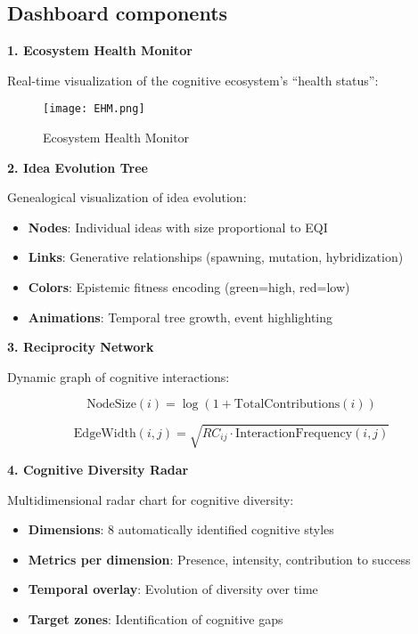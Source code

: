 \subsection{Dashboard components}

\textbf{1. Ecosystem Health Monitor}

Real-time visualization of the cognitive ecosystem's ``health status'':

\begin{figure}[htbp]
	\centering
	\texttt{[image: EHM.png]}
	\caption{Ecosystem Health Monitor}
	\label{tabella:Ecosystem Health Monitor}
\end{figure}

\textbf{2. Idea Evolution Tree}

Genealogical visualization of idea evolution:

\begin{itemize}
	\item \textbf{Nodes}: Individual ideas with size proportional to EQI
	\item \textbf{Links}: Generative relationships (spawning, mutation, hybridization)
	\item \textbf{Colors}: Epistemic fitness encoding (green=high, red=low)
	\item \textbf{Animations}: Temporal tree growth, event highlighting
\end{itemize}

\textbf{3. Reciprocity Network}

Dynamic graph of cognitive interactions:

\begin{equation}
	\text{NodeSize}(i) = \log(1 + \text{TotalContributions}(i))
	\label{eq:node-size}
\end{equation}

\begin{equation}
	\text{EdgeWidth}(i,j) = \sqrt{RC_{ij} \cdot \text{InteractionFrequency}(i,j)}
	\label{eq:edge-width}
\end{equation}

\textbf{4. Cognitive Diversity Radar}

Multidimensional radar chart for cognitive diversity:

\begin{itemize}
	\item \textbf{Dimensions}: 8 automatically identified cognitive styles
	\item \textbf{Metrics per dimension}: Presence, intensity, contribution to success
	\item \textbf{Temporal overlay}: Evolution of diversity over time
	\item \textbf{Target zones}: Identification of cognitive gaps
\end{itemize}

